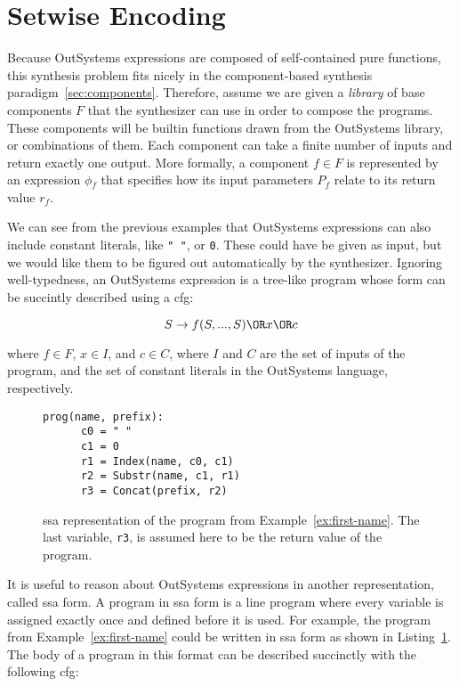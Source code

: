 \section{Setwise Encoding}
\label{sec:setwise-encoding}

Because OutSystems expressions are composed of self-contained pure functions,
this synthesis problem fits nicely in the component-based synthesis
paradigm~\ref{sec:components}. Therefore, assume we are given a \textit{library}
of base components $F$ that the synthesizer can use in order to compose the
programs. These components will be builtin functions drawn from the OutSystems
library, or combinations of them. Each component can take a finite number of
inputs and return exactly one output. More formally, a component $f \in F$ is
represented by an expression $\phi{}_f$ that specifies how its input parameters
$P_f$ relate to its return value $r_f$.

We can see from the previous examples that OutSystems expressions can also
include constant literals, like \lstinline{" "}, or \lstinline{0}. These could
have be given as input, but we would like them to be figured out automatically
by the synthesizer. Ignoring well-typedness, an OutSystems expression is a
tree-like program whose form can be succintly described using a \gls{cfg}:

\[S \rightarrow f(S, ..., S) \OR x \OR c\]

\noindent
where $f \in F$, $x \in I$, and $c \in C$, where $I$ and $C$ are the set of
inputs of the program, and the set of constant literals in the OutSystems
language, respectively.

\begin{figure}
  \begin{lstlisting}[frame=tlrb]
    prog(name, prefix):
      c0 = " "
      c1 = 0
      r1 = Index(name, c0, c1)
      r2 = Substr(name, c1, r1)
      r3 = Concat(prefix, r2)
  \end{lstlisting}
\caption{\gls{ssa} representation of the program from
    Example~\ref{ex:first-name}. The last variable, \lstinline{r3}, is assumed
    here to be the return value of the program.}
\label{fig:first-name-ssa}
\end{figure}

It is useful to reason about OutSystems expressions in another representation,
called \gls{ssa} form. A program in \gls{ssa} form is a line program where every
variable is assigned exactly once and defined before it is used. For example,
the program from Example~\ref{ex:first-name} could be written in \gls{ssa} form
as shown in Listing~\ref{fig:first-name-ssa}. The body of a program in this
format can be described succinctly with the following \gls{cfg}:


